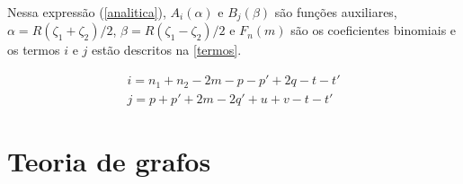 Nessa expressão (\autoref{analitica}), $A_i (\alpha)$ e $B_j (\beta)$ são funções auxiliares, $\alpha = R(\zeta_1 + \zeta_2)/2$, $\beta = R(\zeta_1 - \zeta_2)/2$ e $F_n(m)$ são os coeficientes binomiais \autocite{Mekelleche1997} e os termos $i$ e $j$ estão descritos na \autoref{termos}.

\begin{align}
\label{termos}
    i = n_1 + n_2 - 2m - p - p' + 2q - t - t' \\[0.35cm]
    j = p + p' + 2m - 2q' + u + v - t - t'
\end{align}







\section{Teoria de grafos}

